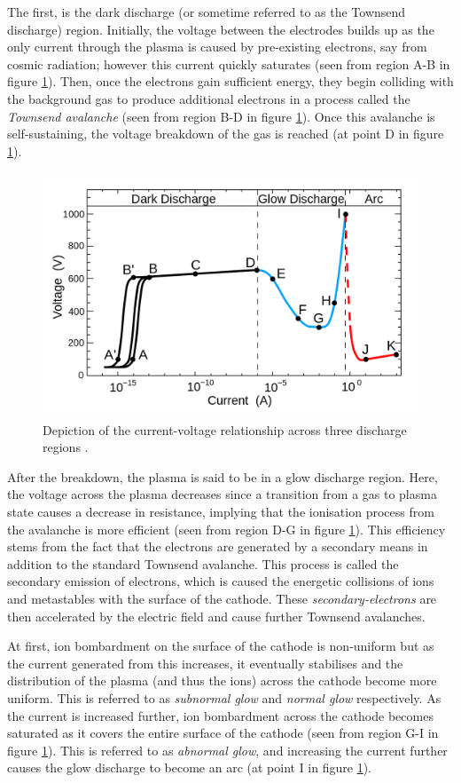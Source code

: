 The first, is the dark discharge (or sometime referred to as the Townsend discharge) region. Initially, the voltage between the electrodes builds up as the only current through the plasma is caused by pre-existing electrons, say from cosmic radiation; however this current quickly saturates (seen from region A-B in figure \ref{fig:dc_discharge}). Then, once the electrons gain sufficient energy, they begin colliding with the background gas to produce additional electrons in a process called the \textit{Townsend avalanche} (seen from region B-D in figure \ref{fig:dc_discharge}). Once this avalanche is self-sustaining, the voltage breakdown of the gas is reached (at point D in figure \ref{fig:dc_discharge}).

\begin{figure}[h!]
	\centering
	\includegraphics[width=0.8\linewidth]{chapter_2/figures/dc_discharge.png}
	\caption{Depiction of the current-voltage relationship across three discharge regions \cite{Gallo1975}.}
	\label{fig:dc_discharge}
\end{figure}

After the breakdown, the plasma is said to be in a glow discharge region. Here, the voltage across the plasma decreases since a transition from a gas to plasma state causes a decrease in resistance, implying that the ionisation process from the avalanche is more efficient (seen from region D-G in figure \ref{fig:dc_discharge}). This efficiency stems from the fact that the electrons are generated by a secondary means in addition to the standard Townsend avalanche. This process is called the secondary emission of electrons, which is caused the energetic collisions of ions and metastables with the surface of the cathode. These \textit{secondary-electrons} are then accelerated by the electric field and cause further Townsend avalanches.

At first, ion bombardment on the surface of the cathode is non-uniform but as the current generated from this increases, it eventually stabilises and the distribution of the plasma (and thus the ions) across the cathode become more uniform. This is referred to as \textit{subnormal glow} and \textit{normal glow} respectively. As the current is increased further, ion bombardment across the cathode becomes saturated as it covers the entire surface of the cathode (seen from region G-I in figure \ref{fig:dc_discharge}). This is referred to as \textit{abnormal glow}, and increasing the current further causes the glow discharge to become an arc (at point I in figure \ref{fig:dc_discharge}).

